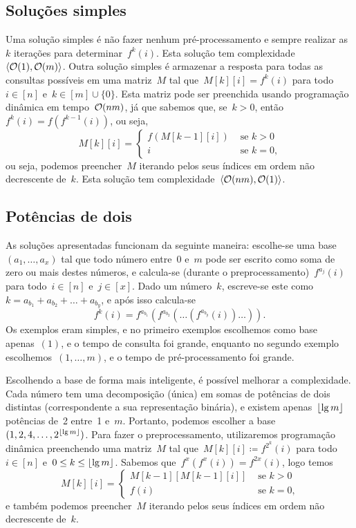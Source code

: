 \documentclass[main.tex]{subfiles}
\begin{document}
\subsection{Soluções simples}

Uma solução simples é não fazer nenhum pré-processamento e sempre realizar as~$k$ iterações para determinar~$f^k(i)$. Esta solução tem complexidade~$\langle\mathcal{O}(1),\mathcal{O}(m)\rangle$. Outra solução simples é armazenar a resposta para todas as consultas possíveis em uma matriz~$M$ tal que~$M[k][i] = f^k(i)$ para todo~$i \in [n]$ e~$k \in [m] \cup \{0\}$. Esta matriz pode ser preenchida usando programação dinâmica em tempo~$\mathcal{O}(nm)$, já que sabemos que, se~$k > 0$, então~$f^k(i) = f(f^{k-1}(i))$, ou seja,
$$M[k][i] = \left\{
	\begin{array}{ll}
		f(M[k - 1][i]) & \text{ se $k > 0$} \\
		i & \text{ se $k = 0$,}
	\end{array}
	\right.
$$
ou seja, podemos preencher~$M$ iterando pelos seus índices em ordem não decrescente de~$k$. Esta solução tem complexidade~$\langle\mathcal{O}(nm), \mathcal{O}(1)\rangle$.

\subsection{Potências de dois} \label{subsec:pot2}

As soluções apresentadas funcionam da seguinte maneira: escolhe-se uma base~$(a_1, \ldots, a_x)$ tal que todo número entre~0 e~$m$ pode ser escrito como soma de zero ou mais destes números, e calcula-se (durante o preprocessamento)~$f^{a_j}(i)$ para todo~$i \in [n]$ e~$j \in [x]$. Dado um número~$k$, escreve-se este como~$k = a_{b_1} + a_{b_2} + \ldots + a_{b_y}$, e após isso calcula-se
$$f^k(i) = f^{a_{b_1}}(f^{a_{b_2}}(\ldots(f^{a_{b_y}}(i))\ldots)).$$
Os exemplos eram simples, e no primeiro exemplos escolhemos como base apenas~$(1)$, e o tempo de consulta foi grande, enquanto no segundo exemplo escolhemos~$(1, \ldots, m)$, e o tempo de pré-processamento foi grande.

Escolhendo a base de forma mais inteligente, é possível melhorar a complexidade. Cada número tem uma decomposição (única) em somas de potências de dois distintas (correspondente a sua representação binária), e existem apenas~$\lfloor\lg m\rfloor$ potências de~2 entre~1 e~$m$. Portanto, podemos escolher a base~${(1, 2, 4, \ldots, 2^{\lfloor\lg m\rfloor})}$. Para fazer o preprocessamento, utilizaremos programação dinâmica preenchendo uma matriz~$M$ tal que~${M[k][i] \coloneqq f^{2^k}(i)}$ para todo~$i \in [n]$ e~$0 \leq k \leq \lfloor\lg m\rfloor$. Sabemos que~$f^x(f^x(i)) = f^{2x}(i)$, logo temos
$$M[k][i] = \left\{
	\begin{array}{ll}
		M[k-1][M[k - 1][i]] & \text{ se $k > 0$} \\
		f(i) & \text{ se $k = 0$,}
	\end{array}
	\right.
$$
e também podemos preencher~$M$ iterando pelos seus índices em ordem não decrescente de~$k$.
\end{document}
